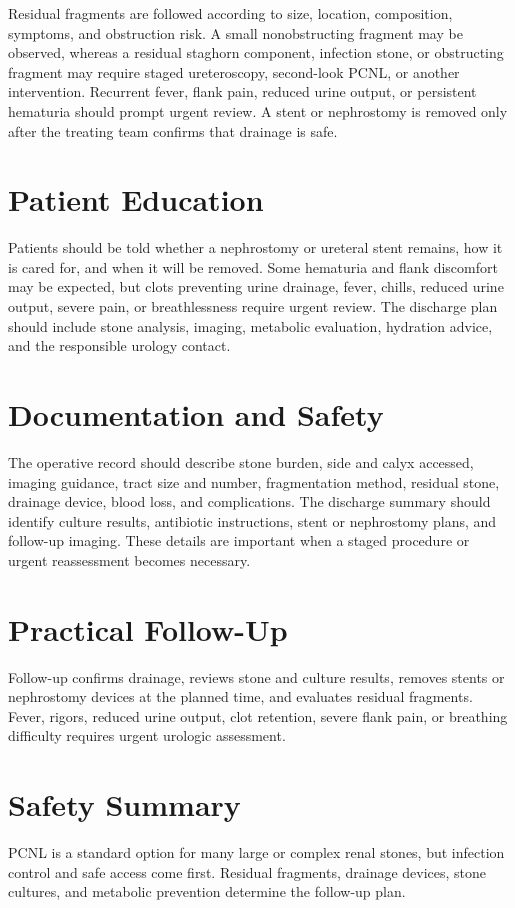 Residual fragments are followed according to size, location, composition, symptoms, and obstruction risk. A small nonobstructing fragment may be observed, whereas a residual staghorn component, infection stone, or obstructing fragment may require staged ureteroscopy, second-look PCNL, or another intervention. Recurrent fever, flank pain, reduced urine output, or persistent hematuria should prompt urgent review. A stent or nephrostomy is removed only after the treating team confirms that drainage is safe.

\section*{Patient Education}
Patients should be told whether a nephrostomy or ureteral stent remains, how it is cared for, and when it will be removed. Some hematuria and flank discomfort may be expected, but clots preventing urine drainage, fever, chills, reduced urine output, severe pain, or breathlessness require urgent review. The discharge plan should include stone analysis, imaging, metabolic evaluation, hydration advice, and the responsible urology contact.

\section*{Documentation and Safety}
The operative record should describe stone burden, side and calyx accessed, imaging guidance, tract size and number, fragmentation method, residual stone, drainage device, blood loss, and complications. The discharge summary should identify culture results, antibiotic instructions, stent or nephrostomy plans, and follow-up imaging. These details are important when a staged procedure or urgent reassessment becomes necessary.

\section*{Practical Follow-Up}
Follow-up confirms drainage, reviews stone and culture results, removes stents or nephrostomy devices at the planned time, and evaluates residual fragments. Fever, rigors, reduced urine output, clot retention, severe flank pain, or breathing difficulty requires urgent urologic assessment.

\section*{Safety Summary}
PCNL is a standard option for many large or complex renal stones, but infection control and safe access come first. Residual fragments, drainage devices, stone cultures, and metabolic prevention determine the follow-up plan.

